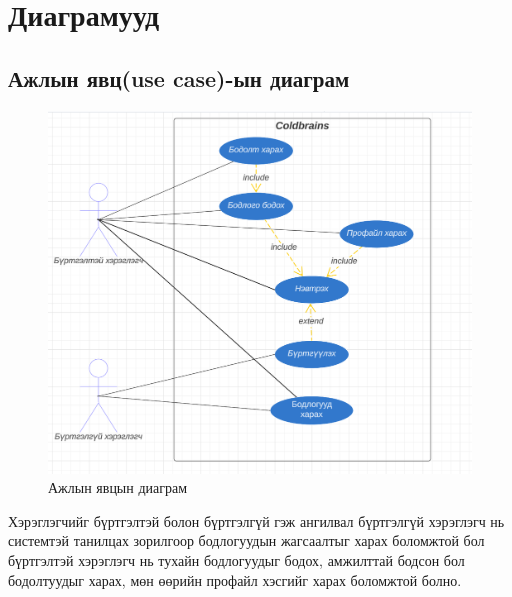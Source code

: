 \clearpage

\section{Диаграмууд}
\subsection{Ажлын явц(use case)-ын диаграм}

\begin{figure}[h]
  \centering
  \includegraphics{img/diagrams/use-case.PNG}
  \caption{Ажлын явцын диаграм}
\end{figure}

Хэрэглэгчийг бүртгэлтэй болон бүртгэлгүй гэж ангилвал бүртгэлгүй хэрэглэгч нь системтэй танилцах зорилгоор бодлогуудын жагсаалтыг харах боломжтой бол бүртгэлтэй хэрэглэгч нь тухайн бодлогуудыг бодох, амжилттай бодсон бол бодолтуудыг харах, мөн өөрийн профайл хэсгийг харах боломжтой болно.

\clearpage